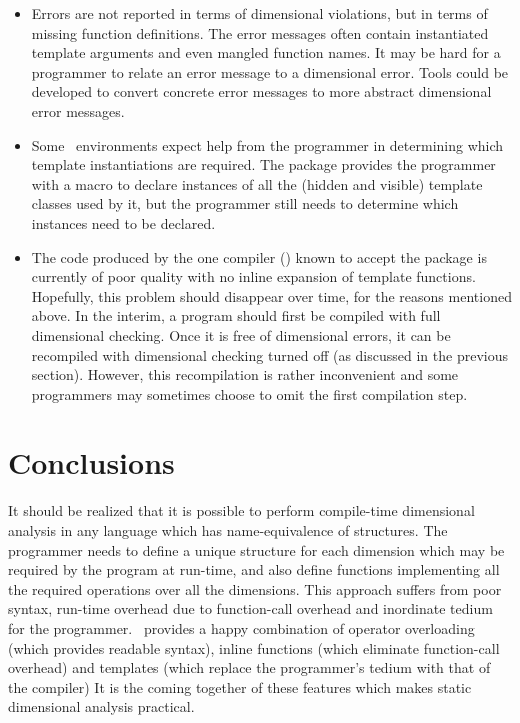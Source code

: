 \begin{itemize}
\item Errors are not reported in terms of dimensional violations,
but in terms of missing function definitions.  The error messages
often contain instantiated template arguments and even mangled
function names.  It may be hard for a programmer to relate an
error message to a dimensional error.  Tools could be developed
to convert concrete error messages to more abstract
dimensional error messages.

\item Some \cpp\ environments expect help from the programmer in
determining which template instantiations are required.  The
package provides the programmer with a macro to declare instances
of all the (hidden and visible) template classes used by it, but
the programmer still needs to determine which instances need to be
declared. 

\item The code produced by the one compiler (\gpp) known to accept
the package is currently of poor quality with no inline expansion
of template functions. Hopefully, this problem should disappear
over time, for the reasons mentioned above.  In the interim, a
program should first be compiled with full dimensional checking.
Once it is free of dimensional errors, it can be recompiled with
dimensional checking turned off (as discussed in the previous
section).  However, this recompilation is rather inconvenient and
some programmers may sometimes choose to omit the first
compilation step.

\end{itemize}

\section{Conclusions}

It should be realized that it is possible to perform compile-time
dimensional analysis in any language which has name-equivalence of
structures.  The programmer needs to define a unique structure for
each dimension which may be required by the program at run-time,
and also define functions implementing all the required operations
over all the dimensions.  This approach suffers from poor syntax,
run-time overhead due to function-call overhead and inordinate
tedium for the programmer.  \cpp\ provides a happy combination of
operator overloading (which provides readable syntax), inline
functions (which eliminate function-call overhead) and templates
(which replace the programmer's tedium with that of the compiler)
It is the coming together of these features which makes static
dimensional analysis practical.

